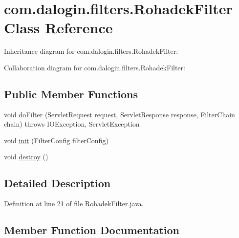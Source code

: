 \hypertarget{classcom_1_1dalogin_1_1filters_1_1_rohadek_filter}{}\section{com.\+dalogin.\+filters.\+Rohadek\+Filter Class Reference}
\label{classcom_1_1dalogin_1_1filters_1_1_rohadek_filter}


Inheritance diagram for com.\+dalogin.\+filters.\+Rohadek\+Filter\+:


Collaboration diagram for com.\+dalogin.\+filters.\+Rohadek\+Filter\+:
\subsection*{Public Member Functions}
\begin{DoxyCompactItemize}
\item 
void \hyperlink{classcom_1_1dalogin_1_1filters_1_1_rohadek_filter_a20e20c5eefa9d99e48b72dfb728a41a9}{do\+Filter} (Servlet\+Request request, Servlet\+Response response, Filter\+Chain chain)  throws I\+O\+Exception, Servlet\+Exception     
\item 
void \hyperlink{classcom_1_1dalogin_1_1filters_1_1_rohadek_filter_a800e469b75fd8323acc7fb565914cb74}{init} (Filter\+Config filter\+Config)
\item 
void \hyperlink{classcom_1_1dalogin_1_1filters_1_1_rohadek_filter_a5a4c793193d7430fed7e2021d9243d66}{destroy} ()
\end{DoxyCompactItemize}


\subsection{Detailed Description}


Definition at line 21 of file Rohadek\+Filter.\+java.



\subsection{Member Function Documentation}
\mbox{\label{classcom_1_1dalogin_1_1filters_1_1_rohadek_filter_a5a4c793193d7430fed7e2021d9243d66}} 
